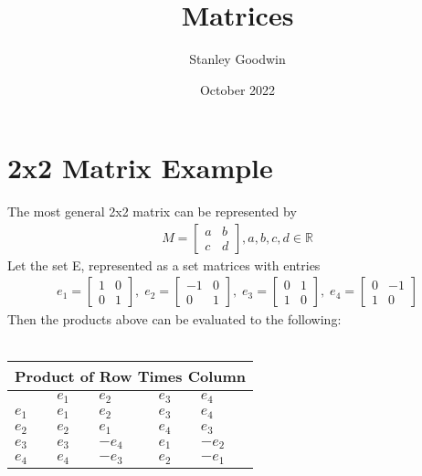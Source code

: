 \documentclass[12pt]{article}
\title{Matrices}
\author{Stanley Goodwin}
\date{October 2022}
\begin{document}
\maketitle

\section{2x2 Matrix Example}
The most general 2x2 matrix can be represented by
\begin{gather*}
    M = \begin{bmatrix} a & b \\ c & d \end{bmatrix}, a,b,c,d \in \mathbb{R}
\end{gather*}
Let the set E, represented as a set matrices with entries
\begin{gather*}
    e_1 = \begin{bmatrix} 1 & 0 \\ 0 & 1 \end{bmatrix},\;
    e_2 = \begin{bmatrix} -1 & 0 \\ 0 & 1 \end{bmatrix},\;
    e_3 = \begin{bmatrix} 0 & 1 \\ 1 & 0 \end{bmatrix},\;
    e_4 = \begin{bmatrix} 0 & -1 \\ 1 & 0 \end{bmatrix}
\end{gather*}
Then the products above can be evaluated to the following: \\ \\
\begin{tabular}{|p{0.25cm}||p{2cm}|p{2cm}|p{2cm}|p{2cm}|}
    \hline \multicolumn{5}{|c|}{Product of Row Times Column} \\
    \hline & $e_1$ & $e_2$ & $e_3$  & $e_4$\\
    \hline
        $e_1$ & $e_1$ & $e_2$ & $e_3$ & $e_4$ \\
        $e_2$ & $e_2$ & $e_1$ & $e_4$ & $e_3$ \\
        $e_3$ & $e_3$ & $-e_4$ & $e_1$ & $-e_2$ \\
        $e_4$ & $e_4$ & $-e_3$ & $e_2$ & $-e_1$ \\
    \hline
\end{tabular}
\end{document}
